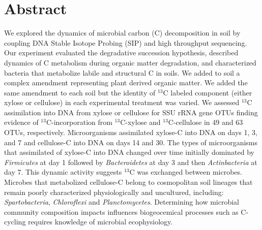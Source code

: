 \section{Abstract} We explored the dynamics of microbial carbon (C)
decomposition in soil by coupling DNA Stable Isotope Probing (SIP) and high
throughput sequencing. Our experiment evaluated the degradative succession
hypothesis, described dynamics of C metabolism during organic matter
degradation, and characterized bacteria that metabolize labile and structural
C in soils. We added to soil a complex amendment representing plant derived
organic matter. We added the same amendment to each soil but the identity of
$^{13}$C labeled component (either xylose or cellulose) in each experimental
treatment was varied. We assessed $^{13}$C assimilation into DNA from xylose or
cellulose for SSU rRNA gene OTUs finding evidence of $^{13}$C-incorporation
from $^{13}$C-xylose and $^{13}$C-cellulose in 49 and 63 OTUs, respectively.
Microorganisms assimilated xylose-C into DNA on days 1, 3, and 7 and
cellulose-C into DNA on days 14 and 30. The types of microorganisms that
assimilated of xylose-C into DNA changed over time initially dominated by
\textit{Firmicutes} at day 1 followed by \textit{Bacteroidetes} at day 3 and
then \textit{Actinbacteria} at day 7. This dynamic activity suggests $^{13}$C
was exchanged between microbes. Microbes that metabolized cellulose-C belong to
cosmopolitan soil lineages that remain poorly characterized physiologically and
uncultured, including: \textit{Spartobacteria}, \textit{Chloroflexi} and
\textit{Planctomycetes}. Determining how microbial community composition
impacts influences biogeocemical processes such as C-cycling requires knowledge
of microbial ecophysiology.
